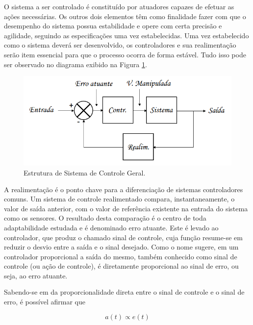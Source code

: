 \documentclass[portugues, brazil, a4paper,12pt]{article}
\begin{document}
			O sistema a ser controlado é constituído por atuadores capazes de efetuar as ações necessárias. Os outros dois elementos têm como finalidade fazer com que o desempenho do sistema possua estabilidade e opere com certa precisão e agilidade, seguindo as especificações uma vez estabelecidas. Uma vez estabelecido como o sistema deverá ser desenvolvido, os controladores e sua realimentação serão item essencial para que o processo ocorra de forma estável. Tudo isso pode ser observado no diagrama exibido na Figura \ref{fig:estrutura_sistema_controle}.
			
			\begin{figure}[H]
				\centering
				\includegraphics[width=\linewidth]{img/cp-realimentacao.png}
				\caption{Estrutura de Sistema de Controle Geral.}
				\label{fig:estrutura_sistema_controle}
			\end{figure}
			
			A realimentação é o ponto chave para a diferenciação de sistemas controladores comuns. Um sistema de controle realimentado compara, instantaneamente, o valor de saída anterior, com o valor de referência existente na entrada do sistema como os sensores. O resultado desta comparação é o centro de toda adaptabilidade estudada e é denominado erro atuante. Este é levado ao controlador, que produz o chamado sinal de controle, cuja função resume-se em reduzir o desvio entre a saída e o sinal desejado. Como o nome sugere, em um controlador proporcional a saída do mesmo, também conhecido como sinal de controle (ou ação de controle), é diretamente proporcional ao sinal de erro, ou seja, ao erro atuante.
			
			Sabendo-se em da proporcionalidade direta entre o sinal de controle e o sinal de erro, é possível afirmar que
			
			
			\begin{equation}
				a(t) \propto e(t)
			\end{equation}
			
\end{document}
